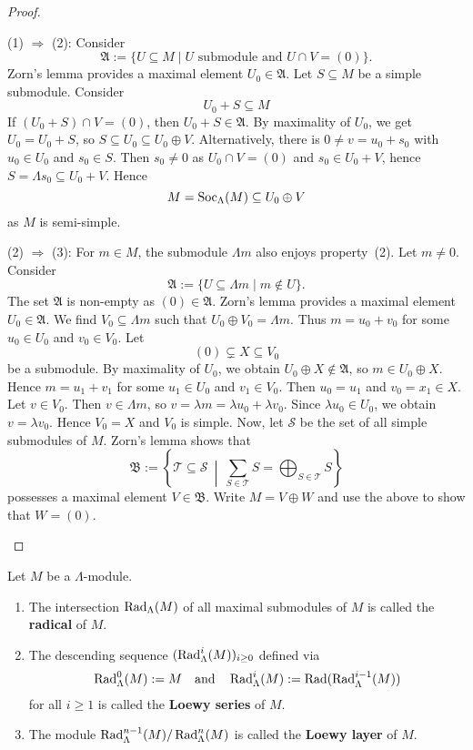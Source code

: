 \begin{proof}\
\begin{addmargin}[1cm]{0cm}

\hspace*{-1cm}(1) $\Rightarrow$ (2): Consider
\[
\mathfrak A := \{ U\subseteq M \mid U \text{ submodule and } U\cap V = (0) \}.
\]
Zorn's lemma provides a maximal element $U_0 \in \mathfrak A$. Let $S\subseteq M$ be a simple submodule. Consider
\[
U_0+S\subseteq M
\]
If $(U_0+S)\cap V=(0)$, then $U_0+S\in \mathfrak A$. By maximality of $U_0$, we get $U_0=U_0+S$, so $S\subseteq U_0\subseteq U_0\oplus V$. Alternatively, there is $0\neq v =u_0+s_0$ with $u_0\in U_0$ and $s_0\in S$. Then $s_0\neq 0$ as $U_0\cap V =(0)$ and $s_0\in U_0+V$, hence $S=\Lambda s_0 \subseteq U_0+V$. Hence 
\[
M = \operatorname{Soc}_\Lambda(M) \subseteq U_0 \oplus V
\]
as $M$ is semi-simple.

\hspace*{-1cm}(2) $\Rightarrow$ (3): For $m\in M$, the submodule $\Lambda m$ also enjoys property~(2). Let $m\neq 0$. Consider
\[
\mathfrak A := \{ U\subseteq \Lambda m \mid m \notin U \}.
\]
The set $\mathfrak A$ is non-empty as $(0)\in \mathfrak A$. Zorn's lemma provides a maximal element $U_0\in \mathfrak A$. We find $V_0\subseteq \Lambda m$ such that $U_0\oplus V_0=\Lambda m$. Thus $m=u_0+v_0$ for some $u_0\in U_0$ and $v_0\in V_0$. Let
\[
(0)\subsetneq X\subseteq V_0
\]
be a submodule. By maximality of $U_0$, we obtain $U_0\oplus X \notin \mathfrak A$, so $m\in U_0\oplus X$. Hence $m=u_1+v_1$ for some $u_1\in U_0$ and $v_1\in V_0$. Then $u_0=u_1$ and $v_0=x_1\in X$. Let $v\in V_0$. Then $v\in \Lambda m$, so $v = \lambda m = \lambda u_0 + \lambda v_0$. Since $\lambda u_0\in U_0$, we obtain $v=\lambda v_0$. Hence $V_0 = X$ and $V_0$ is simple. Now, let $\mathcal S$ be the set of all simple submodules of $M$. Zorn's lemma shows that
\[
\mathfrak B := \left\{ \mathcal T \subseteq \mathcal S \ \middle| \ \sum_{S\in\mathcal T} S = \bigoplus_{S\in\mathcal T} S \right\}
\]
possesses a maximal element $V\in\mathfrak B$. Write $M=V\oplus W$ and use the above to show that $W=(0)$.\qedhere
\end{addmargin}
\end{proof}


\begin{definition}
Let $M$ be a $\Lambda$-module.
\begin{enumerate}
\item The intersection $\operatorname{Rad}_\Lambda(M)$ of all maximal submodules of $M$ is called the \textbf{radical} of $M$.
\item The descending sequence $(\operatorname{Rad}_\Lambda^i(M))_{i\ge 0}$ defined via
\[
\operatorname{Rad}_\Lambda^0(M) := M
\quad\text{and}\quad
\operatorname{Rad}_\Lambda^i(M) := \operatorname{Rad}(\operatorname{Rad}_\Lambda^{i-1}(M))
\]
for all $i\ge 1$ is called the \textbf{Loewy series} of $M$.
\item The module $\operatorname{Rad}_\Lambda^{n-1}(M)/\operatorname{Rad}_\Lambda^{n}(M)$ is called the \textbf{Loewy layer} of $M$. 
\end{enumerate}
\end{definition}


